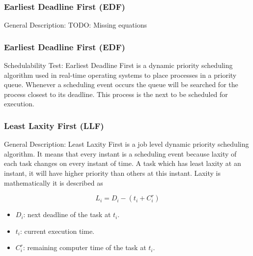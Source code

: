 \documentclass[xcolor=table]{beamer}
\begin{document}
\begin{frame}
\frametitle{Earliest Deadline First (\textbf{EDF})}

\begin{alertblock}{General Description:}
TODO: Missing equations
\end{alertblock}

\end{frame}

\begin{frame}
\frametitle{Earliest Deadline First (\textbf{EDF})}

\begin{block}{Schedulability Test:}
Earliest Deadline First is a dynamic priority scheduling algorithm used in real-time operating systems to place processes in a priority queue. Whenever a scheduling event occurs the queue will be searched for the process closest to its deadline. This process is the next to be scheduled for execution.
\end{block}

\end{frame}

\begin{frame}
\frametitle{Least Laxity First (\textbf{LLF})}

\begin{alertblock}{General Description:}
Least Laxity First  is a job level dynamic priority scheduling algorithm. It means that every instant is a scheduling event because laxity of each task changes on every instant of time. A task which has least laxity at an instant, it will have higher priority than others at this instant. Laxity is mathematically it is described as

\begin{equation}
    L_i = D_i - (t_i + C^r_i)
\end{equation}

\begin{itemize}
    \item $D_i$: next deadline of the task at $t_i$.
    \item $t_i$: current execution time.
    \item $C^r_i$: remaining computer time of the task at $t_i$.
\end{itemize}
\end{alertblock}

\end{frame}
\end{document}
